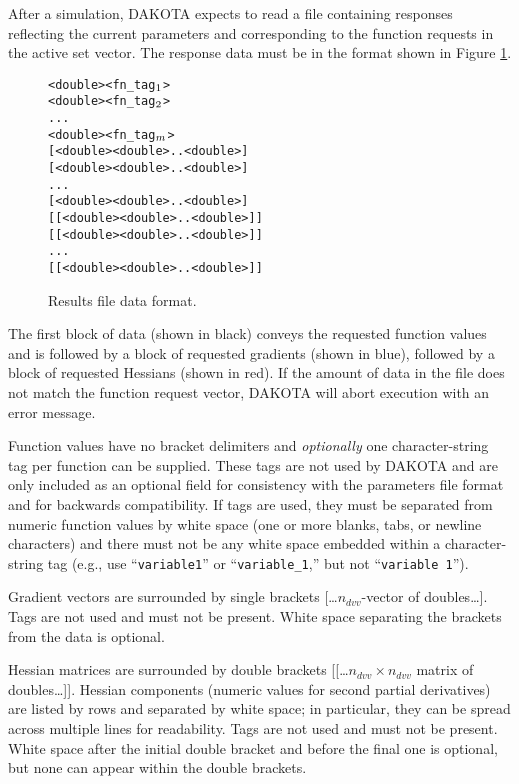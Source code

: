 After a simulation, DAKOTA expects to read a file
containing responses reflecting the current parameters and
corresponding to the function requests in the active
set vector. The response data must be in the format
shown in Figure \ref{responses:figure01}.

\begin{figure}
  \centering
  \begin{bigbox}
  \begin{alltt}
    <double> <fn_tag\(\sb{1}\)>
    <double> <fn_tag\(\sb{2}\)>
    ...
    <double> <fn_tag\(\sb{m}\)> \color{blue}
    [ <double> <double> .. <double> ]
    [ <double> <double> .. <double> ]
    ...
    [ <double> <double> .. <double> ] \color{red}
    [[ <double> <double> .. <double> ]]
    [[ <double> <double> .. <double> ]]
    ...
    [[ <double> <double> .. <double> ]]
  \end{alltt}
  \end{bigbox}
  \caption{Results file data format.}
  \label{responses:figure01}
\end{figure}

The first block of data (shown in black) conveys the requested function values
and is followed by a block of requested gradients
(shown in blue), followed by a block of requested Hessians (shown
in red). If the amount of data in the file does not match the function
request vector, DAKOTA will abort execution with an error message.

Function values have no bracket delimiters and \emph{optionally} one
character-string tag per function can be supplied.  These tags are not
used by
DAKOTA and are only included as an optional field for consistency with
the parameters file format and for backwards compatibility.  If
tags are used, they must be separated from
numeric function values by white space (one or more blanks, tabs, or newline
characters) and there must not
be any white space embedded within a character-string tag (e.g., use
``\texttt{variable1}'' or ``\texttt{variable\_1},'' but not
``\texttt{variable 1}'').

Gradient vectors are surrounded by single brackets
[\ldots$n_{dvv}$-vector of doubles\ldots]. Tags are not used and must
not be present. White space separating the brackets from the data is
optional.

Hessian matrices are surrounded by double brackets
[[\ldots$n_{dvv} \times n_{dvv}$ matrix of doubles\ldots]].  Hessian
components (numeric values for second partial derivatives) are
listed by rows and separated by white space; in particular, they
can be spread across multiple
lines for readability.  Tags are not used and must not be present.
White space after the initial double bracket and before the final one
is optional, but none can appear within the double brackets.

